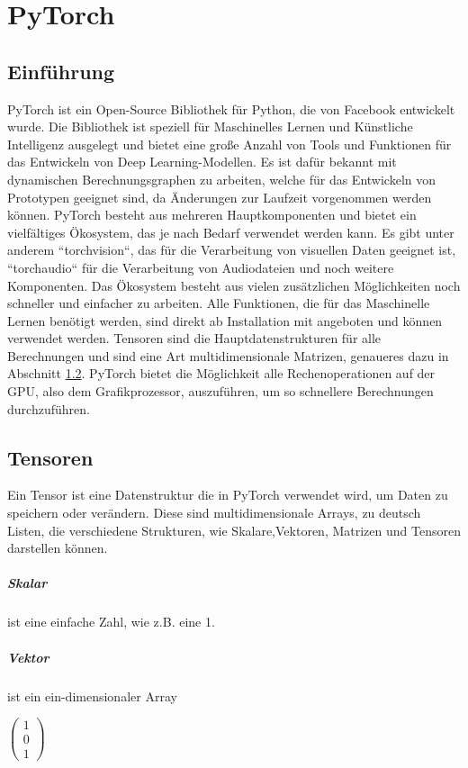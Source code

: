 \chapter{PyTorch}
\section{Einführung}
PyTorch ist ein Open-Source Bibliothek für Python, die von Facebook entwickelt wurde. Die Bibliothek ist speziell für Maschinelles Lernen und Künstliche Intelligenz ausgelegt und bietet eine große Anzahl von Tools und Funktionen für das Entwickeln von Deep Learning-Modellen. Es ist dafür bekannt mit dynamischen Berechnungsgraphen zu arbeiten, welche für das Entwickeln von Prototypen geeignet sind, da Änderungen zur Laufzeit vorgenommen werden können. PyTorch besteht aus mehreren Hauptkomponenten und bietet ein vielfältiges Ökosystem, das je nach Bedarf verwendet werden kann. Es gibt unter anderem ``torchvision``, das für die Verarbeitung von visuellen Daten geeignet ist, ``torchaudio`` für die Verarbeitung von Audiodateien und noch weitere Komponenten. Das Ökosystem besteht aus vielen zusätzlichen Möglichkeiten noch schneller und einfacher zu arbeiten. Alle Funktionen, die für das Maschinelle Lernen benötigt werden, sind direkt ab Installation mit angeboten und können verwendet werden. Tensoren sind die Hauptdatenstrukturen für alle Berechnungen und sind eine Art multidimensionale Matrizen, genaueres dazu in Abschnitt \ref{sec:Tensoren}. PyTorch bietet die Möglichkeit alle Rechenoperationen auf der \acs{GPU}, also dem Grafikprozessor, auszuführen, um so schnellere Berechnungen durchzuführen. \cite[vgl.][]{PyTorch}

\section{Tensoren}
\label{sec:Tensoren}
Ein Tensor ist eine Datenstruktur die in PyTorch verwendet wird, um Daten zu speichern oder verändern. Diese sind multidimensionale Arrays, zu deutsch Listen, die verschiedene Strukturen, wie Skalare,Vektoren, Matrizen und Tensoren darstellen können. \\

\paragraph*{Skalar} ist eine einfache Zahl, wie z.B. eine 1.
\paragraph*{Vektor} ist ein ein-dimensionaler Array \begin{small}$\left(\begin{array}{c} 1 \\ 0 \\ 1 \end{array}\right)$\end{small}
